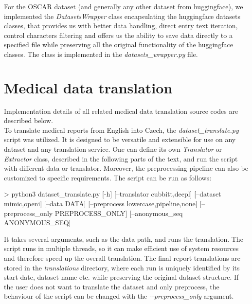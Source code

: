For the OSCAR dataset (and generally any other dataset from huggingface), we implemented the \textit{DatasetsWrapper} class encapsulating the huggingface datasets classes, that provides us with better data handling, direct entry text iteration, control characters filtering and offers us the ability to save data directly to a specified file while preserving all the original functionality of the huggingface classes. The class is implemented in the \textit{datasets\_wrapper.py} file.

\section{Medical data translation}
Implementation details of all related medical data translation source codes are described below.\\

To translate medical reports from English into Czech, the \textit{dataset\_translate.py} script was utilized. It is designed to be versatile and extensible for use on any dataset and any translation service. One can define its own \textit{Translator} or \textit{Extractor} class, described in the following parts of the text, and run the script with different data or translator. Moreover, the preprocessing pipeline can also be customized to specific requirements. The script can be run as follows: \\
\begin{code}
> python3 dataset_translate.py [-h] [--translator {cubbitt,deepl}] 
                               [--dataset {mimic,openi}] 
                               [--data DATA]
                               [--preprocess {lowercase,pipeline,none}] 
                               [--preprocess_only PREPROCESS_ONLY]
                               [--anonymous_seq ANONYMOUS_SEQ]
\end{code}

It takes several arguments, such as the data path, and runs the translation. The script runs in multiple threads, so it can make efficient use of system resources and therefore speed up the overall translation. The final report translations are stored in the \textit{translations} directory, where each run is uniquely identified by its start date, dataset name etc. while preserving the original dataset structure. If the user does not want to translate the dataset and only preprocess, the behaviour of the script can be changed with the \textit{-{}-preprocess\_only} argument.\\

